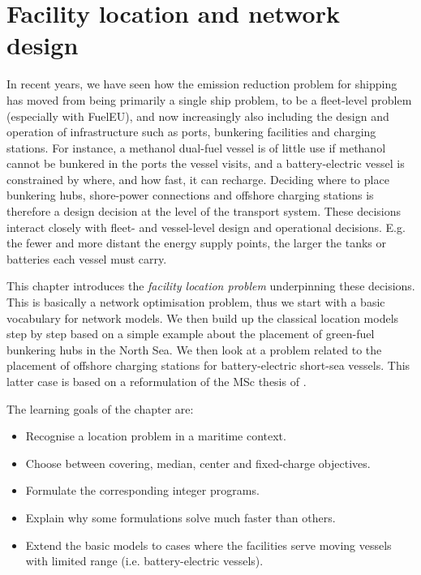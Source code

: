 
\chapter{Facility location and network design}
\label{ch:fl}

In recent years, we have seen how the emission reduction problem for shipping has moved from being primarily a single ship problem, to be a fleet-level problem (especially with FuelEU), and now increasingly also including the design and operation of infrastructure such as ports, bunkering facilities and charging stations. For instance, a methanol dual-fuel vessel is of little use if methanol cannot be bunkered in the ports the vessel visits, and a battery-electric vessel is constrained by where, and how fast, it can recharge. Deciding where to place bunkering hubs, shore-power connections and offshore charging stations is therefore a design decision at the level of the transport system. These decisions interact closely with fleet- and vessel-level design and operational decisions. E.g. the fewer and more distant the energy supply points, the larger the tanks or batteries each vessel must carry.

This chapter introduces the \emph{facility location problem} underpinning these decisions. This is basically a network optimisation problem, thus we start with a basic vocabulary for network models. We then build up the classical location models step by step based on a simple example about the placement of green-fuel bunkering hubs in the North Sea. We then look at a problem related to the placement of offshore charging stations for battery-electric short-sea vessels. This latter case is based on a reformulation of the MSc thesis of \citet{Agersborg2025}.

The learning goals of the chapter are:
\begin{itemize}
  \item Recognise a location problem in a maritime context.
  \item Choose between covering, median, center and fixed-charge objectives.
  \item Formulate the corresponding integer programs.
  \item Explain why some formulations solve much faster than others.
  \item Extend the basic models to cases where the facilities serve moving vessels with limited range (i.e. battery-electric vessels).
\end{itemize}


